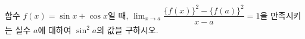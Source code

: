 함수 $f(x)=\sin x+\cos x$일 때, $\displaystyle\lim_{x\to a}\dfrac{\{f(x)\}^2-\{f(a)\}^2}{x-a}=1$을 만족시키는 실수 $a$에 대하여 $\sin^2 a$의 값을 구하시오.
